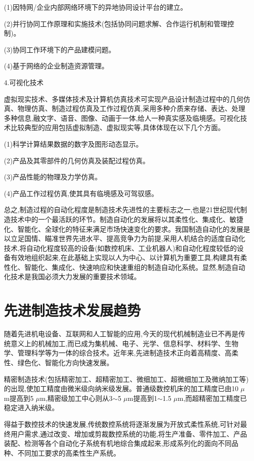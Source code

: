 \documentclass[UTF8]{ctexbook}
\newcommand{\◎}{\ensuremath{\bigcirc}}
\begin{document}
(1)因特网/企业内部网络环境下的异地协同设计平台的建立。

(2)并行协同工作原理和实施技术(包括协同问题求解、合作运行机制和管理控制)。

(3)协同工作环境下的产品建模问题。

(4)基于网络的企业制造资源管理。


    

4.可视化技术
    
    虚拟现实技术、多媒体技术及计算机仿真技术可实现产品设计制造过程中的几何仿真、物理仿真、制造过程仿真及工作过程仿真,采用多种介质来存储、表达、处理多种信息,融文字、语音、图像、动画于一体,给人一种真实感及临境感。可视化技术比较典型的应用包括虚拟制造、虚拟现实等,具体体现在以下几个方面。

(1)科学计算结果数据的数字及图形动态显示。

(2)产品及其零部件的几何仿真及装配过程仿真。

(3)产品性能的物理及力学仿真。

(4)产品工作过程仿真,使其具有临境感及可驾驭感。


总之,制造过程的自动化程度是制造技术先进性的主要标志之一,也是21世纪现代制造技术中的一个最活跃的环节。制造自动化的发展将以其柔性化、集成化、敏捷化、智能化、全球化的特征来满足市场快速变化的要求。我国制造自动化的发展是以立足国情、瞄准世界先进水平、提高竞争力为前提,采用人机结合的适度自动化技术,将自动化程度较高的设备(如数控机床、工业机器人)和自动化程度较低的设备有效地组织起来,在此基础上实现以人为中心、以计算机为重要工具,构建具有柔性化、智能化、集成化、快速响应和快速重组的制造自动化系统。显然,制造自动化技术是我国必须大力发展的重要技术领域。

\section{先进制造技术发展趋势}
随着先进机电设备、互联网和人工智能的应用,今天的现代机械制造业已不再是传统意义上的机械加工,而已成为集机械、电子、光学、信息科学、材料学、生物学、管理科学等为一体的综合技术。近年来,先进制造技术正向着高精度、高柔性、绿色化、智能化方向快速发展。

精密制造技术(包括精密加工、超精密加工、微细加工、超微细加工及微纳加工等)的出现,使加工精度由微米级向纳米级发展。普通级数控机床的加工精度已由10 $\mu$m提高到5 $\mu$m,精密级加工中心则从3$\sim$5 $\mu$m提高到1$\sim$1.5 $\mu$m,而超精密加工精度已稳定进入纳米级。

得益于数控技术的快速发展,传统数控系统将逐渐发展为开放式柔性系统,可针对最终用户需求,通过改变、增加或剪裁数控系统的功能,将生产准备、零件加工、产品装配、检测等各个自动化子系统有机地综合集成起来,形成系列化的面向不同品种、不同加工要求的高柔性生产系统。
\end{document}
